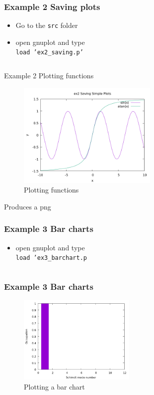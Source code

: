 \documentclass{beamer}
\begin{document}
\begin{frame}[fragile]
    \frametitle{Example 2 Saving plots}
\begin{itemize}
	\item Go to the \texttt{src} folder
    \item open gnuplot and type \\ \texttt{load 'ex2\_saving.p'}
\end{itemize}
\inputminted[fontsize=\small]{bash}{src/ex2_saving.p}
\end{frame}

\begin{frame}{Example 2 Plotting functions}
    \begin{figure}
	\centering
	\includegraphics[width=0.6\textwidth]{src/ex2.png}
	\caption{Plotting functions}
	\label{fig:function}
\end{figure}
Produces a png
\end{frame}

\begin{frame}[fragile]
\frametitle{Example 3 Bar charts}
\begin{itemize}
	\item open gnuplot and type \\ \texttt{load 'ex3\_barchart.p}
\end{itemize}
\inputminted[fontsize=\small, firstline=8]{bash}{src/ex3_barchart.p}
\end{frame}

\begin{frame}
\frametitle{Example 3 Bar charts}
\begin{figure}
	\centering
	\includegraphics[width=0.5\textwidth]{src/ex3.png}
	\caption{Plotting a bar chart}
	\label{fig:function}
\end{figure}
\end{frame}
\end{document}
